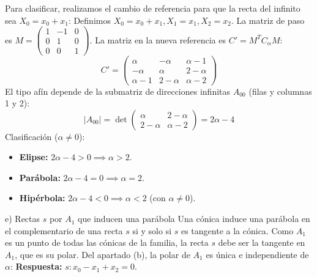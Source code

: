 {Para clasificar, realizamos el cambio de referencia para que la recta del infinito sea $X_0 = x_0 + x_1$:
Definimos $X_0 = x_0 + x_1, X_1 = x_1, X_2 = x_2$. La matriz de paso es $M = \begin{pmatrix} 1 & -1 & 0 \\ 0 & 1 & 0 \\ 0 & 0 & 1 \end{pmatrix}$.
La matriz en la nueva referencia es $C' = M^T C_{\alpha} M$:
\[ C' = \begin{pmatrix} \alpha & -\alpha & \alpha-1 \\ -\alpha & \alpha & 2-\alpha \\ \alpha-1 & 2-\alpha & \alpha-2 \end{pmatrix} \]
El tipo afín depende de la submatriz de direcciones infinitas $A_{00}$ (filas y columnas 1 y 2):
\[ |A_{00}| = \det \begin{pmatrix} \alpha & 2-\alpha \\ 2-\alpha & \alpha-2 \end{pmatrix} = 2\alpha - 4 \]
Clasificación ($\alpha \neq 0$):
\begin{itemize}
    \item \textbf{Elipse:} $2\alpha - 4 > 0 \implies \alpha > 2$.
    \item \textbf{Parábola:} $2\alpha - 4 = 0 \implies \alpha = 2$.
    \item \textbf{Hipérbola:} $2\alpha - 4 < 0 \implies \alpha < 2$ (con $\alpha \neq 0$).
\end{itemize}

e) Rectas $s$ por $A_1$ que inducen una parábola
Una cónica induce una parábola en el complementario de una recta $s$ si y solo si $s$ es tangente a la cónica. Como $A_1$ es un punto de todas las cónicas de la familia, la recta $s$ debe ser la tangente en $A_1$, que es su polar.
Del apartado (b), la polar de $A_1$ es única e independiente de $\alpha$:
\textbf{Respuesta:} $s: x_0 - x_1 + x_2 = 0$.
}

